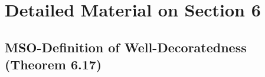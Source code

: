 




\section{Detailed Material on Section 6}\label{app:section-3-proofs}


\subsection{MSO-Definition of Well-Decoratedness (Theorem 6.17)}

